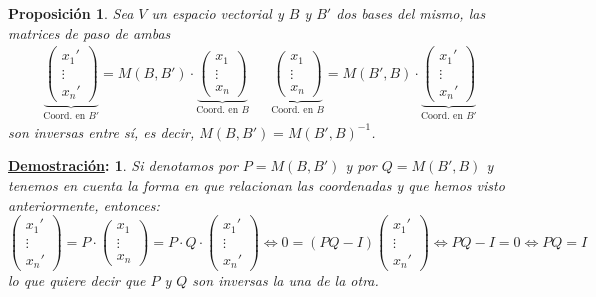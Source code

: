\documentclass[10pt,a4paper,openright]{book}
\theoremstyle{break}
\newtheorem*{prop}{Proposición}
\newtheorem*{demo}{\underline{Demostración}:}
\begin{document}
\begin{prop}
Sea $V$ un espacio vectorial y $B$ y $B'$ dos bases del mismo, las matrices de paso de ambas
\begin{align*}
\underbrace{\left(\begin{array}{c} x_1'\\\vdots\\x_n'\end{array} \right)}_{\mbox{Coord. en } B'} = M(B,B') \cdot \underbrace{\left(\begin{array}{c}x_1\\\vdots\\x_n\end{array}\right)}_{\mbox{Coord. en } B} && \underbrace{\left(\begin{array}{c} x_1\\\vdots\\x_n\end{array} \right)}_{\mbox{Coord. en } B} = M(B',B) \cdot \underbrace{\left(\begin{array}{c}x_1'\\\vdots\\x_n'\end{array}\right)}_{\mbox{Coord. en } B'}
\end{align*}
son inversas entre sí, es decir, $M(B,B') = M(B',B)^{-1}$.
\end{prop}
\begin{demo}
Si denotamos por $P=M(B,B')$ y por $Q=M(B',B)$ y tenemos en cuenta la forma en que relacionan las coordenadas y que hemos visto anteriormente, entonces:
$$
\left(\begin{array}{c} x_1'\\\vdots\\x_n'\end{array} \right)=P\cdot \left(\begin{array}{c}x_1\\\vdots\\x_n\end{array}\right)=P\cdot Q\cdot \left(\begin{array}{c} x_1'\\\vdots\\x_n'\end{array} \right)\Leftrightarrow 0=(PQ-I)\left(\begin{array}{c} x_1'\\\vdots\\x_n'\end{array} \right)\Leftrightarrow PQ-I=0\Leftrightarrow PQ=I
$$
lo que quiere decir que $P$ y $Q$ son inversas la una de la otra.
\end{demo}
\end{document}

